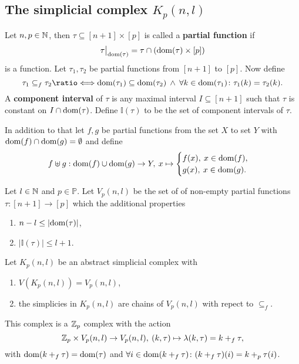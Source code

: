 \subsection{The simplicial complex $K_p(n, l)$}

\begin{defin}
  Let $n, p \in \mathbb{N}$, then $\tau \subseteq [n+1] \times [p]$ is called a \textbf{partial function} if \[\restr{\tau}{\dom(\tau)} = \tau \cap (\dom(\tau) \times [p])\] is a function. Let $\tau_1, \tau_2$ be partial functions from $[n+1]$ to $[p]$. Now define
  \begin{equation*}
    \tau_1 \subseteq_f \tau_2 \longeq \dom(\tau_1) \subseteq \dom(\tau_2) \: \land \: \forall k \in \dom(\tau_1)\colon \tau_1(k) = \tau_2(k).
  \end{equation*}
  A \textbf{component interval} of $\tau$ is any maximal interval $I \subseteq [n+1]$ such that $\tau$ is constant on $I \cap {\rm dom}(\tau)$. Define $\mathbb{I}(\tau)$ to be the set of component intervals of $\tau$. 

  In addition to that let $f, g$ be partial functions from the set $X$ to set $Y$ with ${\rm dom}(f) \cap {\rm dom}(g) = \emptyset$ and define 
  \begin{equation*}
    f \uplus g: {\rm dom}(f) \cup {\rm dom}(g) \to Y, \: x \mapsto \begin{cases}
      f(x), \: x \in {\rm dom}(f), \\
      g(x), \: x \in {\rm dom}(g).
    \end{cases}
  \end{equation*}
\end{defin}

\begin{defin}
  Let $l \in \mathbb{N}$ and $p \in \mathbb{P}$. Let $V_p(n, l)$ be the set of of non-empty partial functions $\tau\colon [n+1] \to [p]$ which the additional properties
  \begin{enumerate}[label=\roman*.)]
    \item $n - l \leq |{\rm dom}(\tau)|$,
    \item $\left|\mathbb{I}(\tau)\right| \leq l+1$.
  \end{enumerate}
\end{defin}

\begin{defin}\label{defin:kpnl}
  Let $K_p(n,l)$ be an abstract simplicial complex with
  \begin{enumerate}[label=\roman*.)]
    \item $V(K_p(n,l)) = V_p(n,l)$,
    \item the simplicies in $K_p(n,l)$ are chains of $V_p(n,l)$ with repect to $\subseteq_f$.
  \end{enumerate}
  This complex is a $\mathbb{Z}_p$ complex with the action
  \begin{equation*}
    \mathbb{Z}_p \times V_p(n,l) \to V_p(n,l), \: (k, \tau) \mapsto \lambda(k, \tau) = k +_f \tau,
  \end{equation*}
  with ${\rm dom}(k +_f \tau) = {\rm dom}(\tau)$ and $\forall i\in {\rm dom}(k +_f \tau)\colon (k+_f\tau)(i) = k +_p \tau(i)$.
\end{defin}

